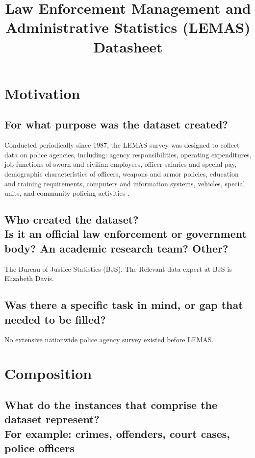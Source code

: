 \documentclass[letterpaper, 10 pt, conference]{ieeeconf}  %
\title{\LARGE \bf
Law Enforcement Management and Administrative Statistics (LEMAS) \\{\color{blue}Datasheet}
}
\newcommand{\subtitle}[1]{{\\ \small \normalfont \color{purple} #1}}
\begin{document}
\maketitle
\thispagestyle{empty}
\pagestyle{empty}

\section{Motivation}

\subsection{For what purpose was the dataset created?}

Conducted periodically since 1987, the LEMAS survey was designed to collect data on police agencies, including: agency responsibilities, operating expenditures, job functions of sworn and civilian employees, officer salaries and special pay, demographic characteristics of officers, weapons and armor policies, education and training requirements, computers and information systems, vehicles, special units, and community policing activities \cite{us2015law}.

\subsection{Who created the dataset? \subtitle{Is it an official law enforcement or government body? An academic research team? Other?}}

The Bureau of Justice Statistics (BJS). The Relevant data expert at BJS is Elizabeth Davis. 

\subsection{Was there a specific task in mind, or gap that needed to be filled?}

No extensive nationwide police agency survey existed before LEMAS.

\section{Composition}

\subsection{What do the instances that comprise the dataset represent? \subtitle{For example: crimes, offenders, court cases, police officers}}
\end{document}
